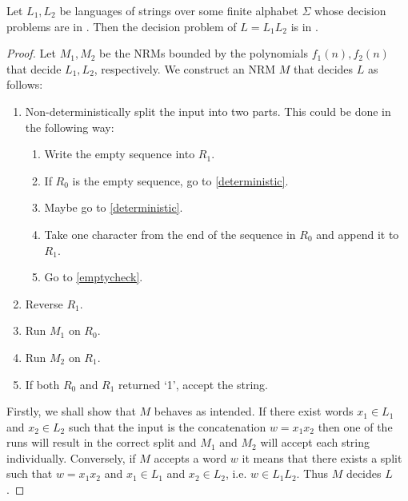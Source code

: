 \documentclass{article}
\begin{document}
\begin{claim*}[c]
    Let $L_1,L_2$ be languages of strings over some finite alphabet $\Sigma$ whose decision problems are in 
    \nptime. Then the decision problem of $L=L_1L_2$ is in \nptime.
    \begin{proof}
        Let $M_1,M_2$ be the NRMs bounded by the polynomials $f_1(n),f_2(n)$ that decide $L_1,L_2$, respectively.
        We construct an NRM $M$ that decides $L$ as follows:
        \begin{enumerate}[label=M\arabic*]
            \item \label{split} Non-deterministically split the input into two parts. This could be done in the following way:
                \begin{enumerate}
                    \item Write the empty sequence into $R_1$.
                    \item \label{emptycheck} If $R_0$ is the empty sequence, go to \ref{deterministic}.
                    \item Maybe go to \ref{deterministic}.
                    \item Take one character from the end of the sequence in $R_0$ and append it to $R_1$.
                    \item Go to \ref{emptycheck}.
                \end{enumerate}
            \item \label{deterministic} Reverse $R_1$.
            \item \label{runm1} Run $M_1$ on $R_0$.
            \item \label{runm2} Run $M_2$ on $R_1$.
            \item \label{trivial} If both $R_0$ and $R_1$ returned `1', accept the string.
        \end{enumerate}
        Firstly, we shall show that $M$ behaves as intended. If there exist words $x_1\in L_1$ and $x_2\in L_2$ such that the input 
        is the concatenation $w=x_1x_2$ then one of the runs will result in the correct 
        split and $M_1$ and $M_2$ will accept each string individually.  Conversely, 
        if $M$ accepts a word $w$ it means that there exists a split such that 
        $w=x_1x_2$ and $x_1\in L_1$ and $x_2\in L_2$, i.e. $w\in L_1L_2$. Thus $M$ 
        decides $L$.


\end{proof}
\end{claim*}
\end{document}

